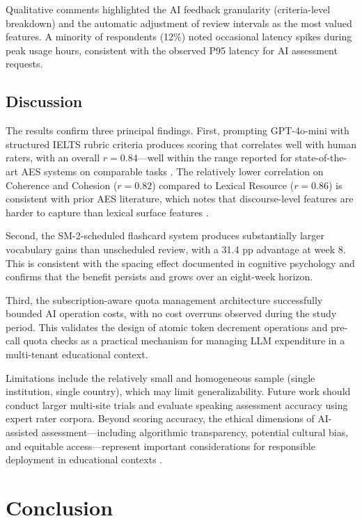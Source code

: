 \documentclass[conference]{IEEEtran}
\begin{document}
Qualitative comments highlighted the AI feedback granularity (criteria-level breakdown) and the automatic adjustment of review intervals as the most valued features. A minority of respondents (12\%) noted occasional latency spikes during peak usage hours, consistent with the observed P95 latency for AI assessment requests.

\subsection{Discussion}
The results confirm three principal findings. First, prompting GPT-4o-mini with structured IELTS rubric criteria produces scoring that correlates well with human raters, with an overall $r = 0.84$—well within the range reported for state-of-the-art AES systems on comparable tasks \cite{b8}. The relatively lower correlation on Coherence and Cohesion ($r = 0.82$) compared to Lexical Resource ($r = 0.86$) is consistent with prior AES literature, which notes that discourse-level features are harder to capture than lexical surface features \cite{b12}.

Second, the SM-2-scheduled flashcard system produces substantially larger vocabulary gains than unscheduled review, with a 31.4 pp advantage at week 8. This is consistent with the spacing effect documented in cognitive psychology \cite{b4} and confirms that the benefit persists and grows over an eight-week horizon.

Third, the subscription-aware quota management architecture successfully bounded AI operation costs, with no cost overruns observed during the study period. This validates the design of atomic token decrement operations and pre-call quota checks as a practical mechanism for managing LLM expenditure in a multi-tenant educational context.

Limitations include the relatively small and homogeneous sample (single institution, single country), which may limit generalizability. Future work should conduct larger multi-site trials and evaluate speaking assessment accuracy using expert rater corpora. Beyond scoring accuracy, the ethical dimensions of AI-assisted assessment---including algorithmic transparency, potential cultural bias, and equitable access---represent important considerations for responsible deployment in educational contexts \cite{b6, b9}.

\section{Conclusion}
\end{document}

